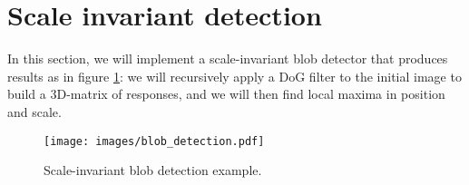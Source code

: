 \section{Scale invariant detection}
In this section, we will implement a scale-invariant blob detector that produces results as in figure \ref{blob_detection}: we will recursively apply a DoG filter to the initial image to build a 3D-matrix of responses, and we will then find local maxima in position and scale. 

\begin{figure}[ht!]
  \begin{center}
    \texttt{[image: images/blob\_detection.pdf]}
  \end{center}
  \caption{\label{blob_detection} Scale-invariant blob detection example.}
\end{figure}



